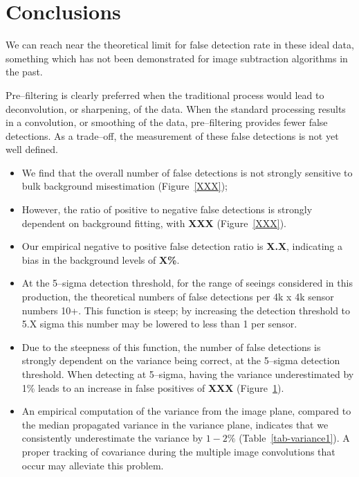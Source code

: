 \documentclass[prd, nofootinbib, floatfix, 11pt,tightenlines,times]{article}
\begin{document}
\section{Conclusions}

We can reach near the theoretical limit for false detection rate in
these ideal data, something which has not been demonstrated for image
subtraction algorithms in the past.

Pre--filtering is clearly preferred when the traditional process would
lead to deconvolution, or sharpening, of the data.  When the standard
processing results in a convolution, or smoothing of the data,
pre--filtering provides fewer false detections.  As a trade--off, the
measurement of these false detections is not yet well defined.

\begin{itemize}

\item We find that the overall number of false detections is not
  strongly sensitive to bulk background misestimation
  (Figure~\ref{XXX});

\item However, the ratio of positive to negative false detections is
  strongly dependent on background fitting, with {\bf XXX}
  (Figure~\ref{XXX}).

\item Our empirical negative to positive false detection ratio is {\bf
  X.X}, indicating a bias in the background levels of {\bf X\%}.

\item At the 5--sigma detection threshold, for the range of seeings
  considered in this production, the theoretical numbers of false
  detections per 4k x 4k sensor numbers 10+.  This function is steep;
  by increasing the detection threshold to 5.X sigma this number may
  be lowered to less than 1 per sensor.

\item Due to the steepness of this function, the number of false
  detections is strongly dependent on the variance being correct, at
  the 5--sigma detection threshold.  When detecting at 5--sigma,
  having the variance underestimated by 1\% leads to an increase
  in false positives of {\bf XXX} (Figure~\ref{}).

\item An empirical computation of the variance from the image plane,
  compared to the median propagated variance in the variance plane,
  indicates that we consistently underestimate the variance by $1-2\%$
  (Table~\ref{tab-variance1}).  A proper tracking of covariance during
  the multiple image convolutions that occur may alleviate this
  problem.


\end{itemize}
\end{document}
